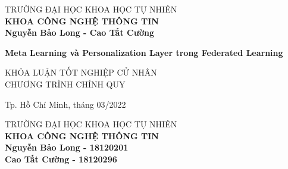 \begin{titlepage}

    \begin{center}
    TRƯỜNG ĐẠI HỌC KHOA HỌC TỰ NHIÊN\\
    \textbf{KHOA CÔNG NGHỆ THÔNG TIN}\\[2cm]


    { \Large \bfseries Nguyễn Bảo Long - Cao Tất Cường\\[2cm] } 


    { \Large \bfseries Meta Learning và Personalization Layer trong Federated Learning\\[3cm]} 


    \large KHÓA LUẬN TỐT NGHIỆP CỬ NHÂN\\
    \large CHƯƠNG TRÌNH CHÍNH QUY\\



    \vfill
    Tp. Hồ Chí Minh, tháng 03/2022

    \end{center}

    \pagebreak

    \begin{center}

    TRƯỜNG ĐẠI HỌC KHOA HỌC TỰ NHIÊN\\
    \textbf{KHOA CÔNG NGHỆ THÔNG TIN}\\[2cm]

    {\large \bfseries Nguyễn Bảo Long - 18120201\\} 
    {\large \bfseries Cao Tất Cường - 18120296\\[2cm]}


\end{center}
\end{titlepage}
